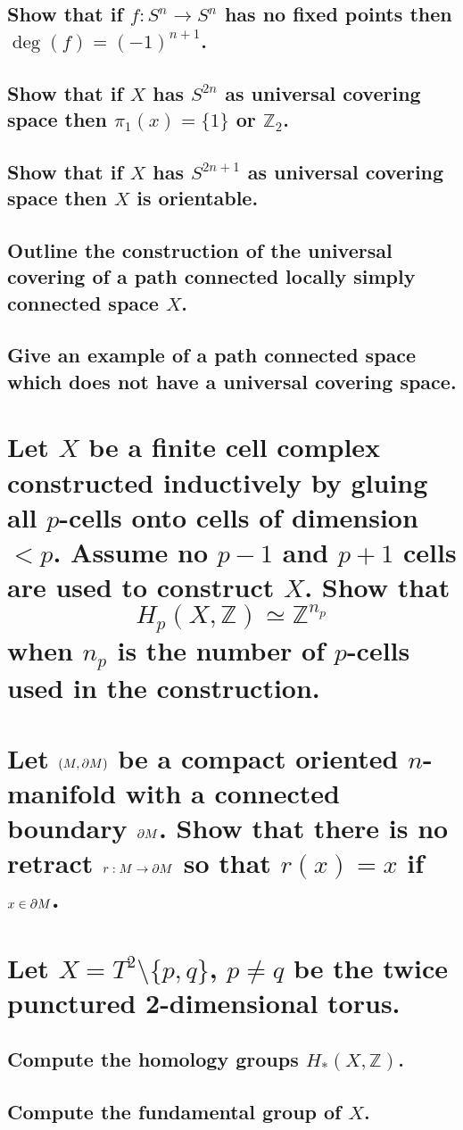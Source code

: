 \documentclass[10pt]{article}
\begin{document}
\advsection{}

\subsection{Show that if $f: S^n \to S^n$ has no fixed points then $\deg(f) = (-1)^{n+1}$.}

\subsection{Show that if $X$ has $S^{2n}$ as universal covering space then $\pi_1(x) = \{1\}$ or $\mathbb{Z}_2$.}

\subsection{Show that if $X$ has $S^{2n+1}$ as universal covering space then $X$ is orientable.}

\advsection{}

\subsection{Outline the construction of the universal covering of a path connected locally simply
  connected space $X$.}

\subsection{Give an example of a path connected space which does not have a universal covering space.}

\section{Let $X$ be a finite cell complex constructed inductively by gluing all $p$-cells onto cells
of dimension $<p$. Assume no $p-1$ and $p+1$ cells are used to construct $X$. Show that 
$$H_p(X,\mathbb{Z}) \simeq \mathbb{Z}^{n_p}$$
when $n_p$ is the number of $p$-cells used in the construction.}

\section{Let $(M, \partial M)$ be a compact oriented $n$-manifold with a connected boundary $\partial
  M$. Show that there is no retract $r:M \to \partial M$ so that $r(x) =x$ if $x \in \partial M$. 
}

\section{Let $X = T^2 \setminus \{ p,q\}$, $p \neq q$ be the twice punctured 2-dimensional torus.}

\subsection{Compute the homology groups $H_*(X,\mathbb{Z})$.}

\subsection{Compute the fundamental group of $X$.}
\end{document}
